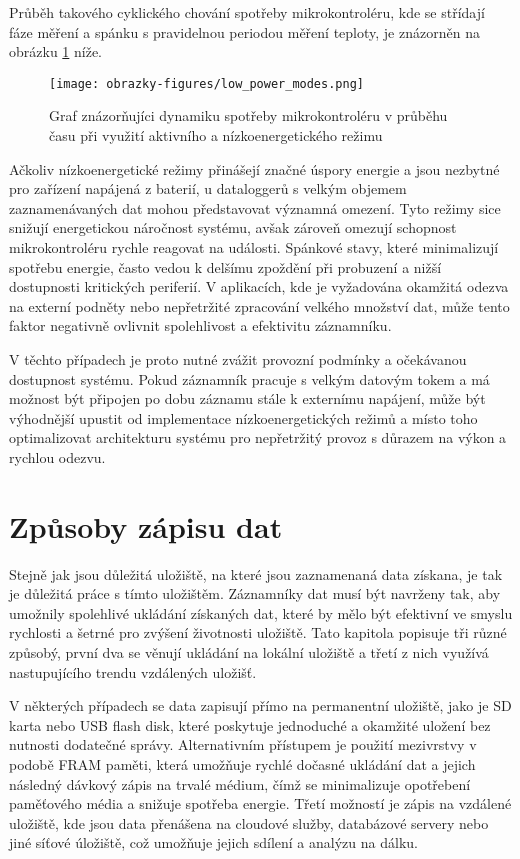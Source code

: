 Průběh takového cyklického chování spotřeby mikrokontroléru, kde se střídají fáze měření a spánku s pravidelnou periodou měření 
teploty, je znázorněn na obrázku \ref{fig:low-power-modes} níže.

\begin{figure}[h]
    \centering
    \texttt{[image: obrazky-figures/low\_power\_modes.png]}
    
    \caption{Graf znázorňujíci dynamiku spotřeby mikrokontroléru v průběhu času při využití aktivního a nízkoenergetického režimu}
    \label{fig:low-power-modes}
\end{figure}

Ačkoliv nízkoenergetické režimy přinášejí značné úspory energie a jsou nezbytné pro zařízení napájená z baterií, u dataloggerů s 
velkým objemem zaznamenávaných dat mohou představovat významná omezení. Tyto režimy sice snižují energetickou náročnost systému, 
avšak zároveň omezují schopnost mikrokontroléru rychle reagovat na události. Spánkové stavy, které minimalizují spotřebu energie, 
často vedou k delšímu zpoždění při probuzení a nižší dostupnosti kritických periferií. V aplikacích, kde je vyžadována okamžitá 
odezva na externí podněty nebo nepřetržité zpracování velkého množství dat, může tento faktor negativně ovlivnit spolehlivost a 
efektivitu záznamníku. \cite{embedded_low_power_modes}

V těchto případech je proto nutné zvážit provozní podmínky a očekávanou dostupnost systému. Pokud záznamník pracuje s velkým 
datovým tokem a má možnost být připojen po dobu záznamu stále k externímu napájení, může být výhodnější upustit od implementace 
nízkoenergetických režimů a místo toho optimalizovat architekturu systému pro nepřetržitý provoz s důrazem na výkon a rychlou 
odezvu. \cite{analog_devices_low_power_modes}

\section{Způsoby zápisu dat}
Stejně jak jsou důležitá uložiště, na které jsou zaznamenaná data získana, je tak je důležitá práce s tímto uložištěm. 
Záznamníky dat musí být navrženy tak, aby umožnily spolehlivé ukládání získaných dat, které by mělo být efektivní ve 
smyslu rychlosti a šetrné pro zvýšení životnosti uložiště. Tato kapitola popisuje tři různé způsobý, první dva se věnují 
ukládání na lokální uložiště a třetí z nich využívá nastupujícího trendu vzdálených uložišť.

V některých případech se data zapisují přímo na permanentní uložiště, jako je SD karta nebo USB flash disk, které poskytuje 
jednoduché a okamžité uložení bez nutnosti dodatečné správy. Alternativním přístupem je použití mezivrstvy v podobě FRAM paměti, 
která umožňuje rychlé dočasné ukládání dat a jejich následný dávkový zápis na trvalé médium, čímž se minimalizuje opotřebení 
paměťového média a snižuje spotřeba energie. Třetí možností je zápis na vzdálené uložiště, kde jsou data přenášena na cloudové 
služby, databázové servery nebo jiné síťové úložiště, což umožňuje jejich sdílení a analýzu na dálku.

